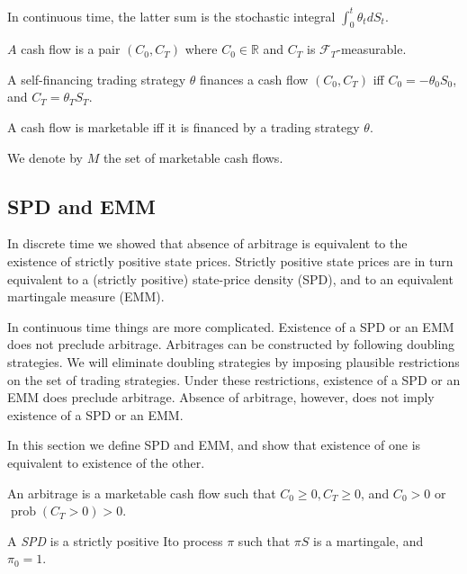 \documentclass[\topdir/lecture\_notes.tex]{subfiles}
\begin{document}
In continuous time, the latter sum is the stochastic integral \(\int_{0}^{t} \theta_{t} d S_{t}\).

\begin{defn}\label{def:cash_flow}
\(A\) cash flow is a pair \(\left(C_{0}, C_{T}\right)\) where \(C_{0} \in \mathbb{R}\) and \(C_{T}\) is \(\mathcal{F}_{T}\)-measurable.
\end{defn}

\begin{defn}\label{def:finances_cash_flow}
A self-financing trading strategy \(\theta\) finances a cash flow \(\left(C_{0}, C_{T}\right)\) iff \(C_{0}=-\theta_{0} S_{0}\), and \(C_{T}=\theta_{T} S_{T}\).
\end{defn}

\begin{defn}\label{def:marketable_cash_flow}
A cash flow is marketable iff it is financed by a trading strategy \(\theta\).
\end{defn}

We denote by \(M\) the set of marketable cash flows.

\subsection{SPD and EMM}
In discrete time we showed that absence of arbitrage is equivalent to the existence of strictly positive state prices. Strictly positive state prices are in turn equivalent to a (strictly positive) state-price density (SPD), and to an equivalent martingale measure (EMM).

In continuous time things are more complicated. Existence of a SPD or an EMM does not preclude arbitrage. Arbitrages can be constructed by following doubling strategies. We will eliminate doubling strategies by imposing plausible restrictions on the set of trading strategies. Under these restrictions, existence of a SPD or an EMM does preclude arbitrage. Absence of arbitrage, however, does not imply existence of a SPD or an EMM.

In this section we define SPD and EMM, and show that existence of one is equivalent to existence of the other.

\begin{defn}\label{def:arbitrage_continuous}
An arbitrage is a marketable cash flow such that \(C_{0} \geq 0, C_{T} \geq 0\), and \(C_{0}>0\) or \(\operatorname{prob}\left(C_{T}>0\right)>0\).
\end{defn}

\begin{defn}\label{def:spd}
A \emph{SPD} is a strictly positive Ito process \(\pi\) such that \(\pi S\) is a martingale, and \(\pi_{0}=1\).
\end{defn}
\end{document}
